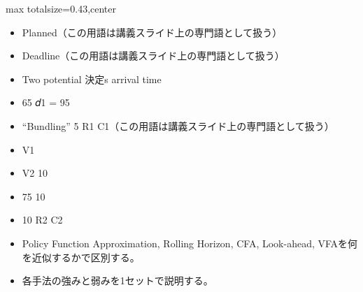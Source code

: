 \clearpage
{}
\begin{minipage}[t]{0.405\textwidth}
\begin{adjustbox}{max totalsize={\textwidth}{0.43\textheight},center}
\begin{minipage}{\textwidth}\scriptsize
{}\begin{itemize}
\item Planned（この用語は講義スライド上の専門語として扱う）
\item Deadline（この用語は講義スライド上の専門語として扱う）
\item Two potential 決定s arrival time
\item 65 𝑑1 = 95
\item “Bundling” 5 R1 C1（この用語は講義スライド上の専門語として扱う）
\item V1
\item V2 10
\item 75 10
\item 10 R2 C2
\end{itemize}\begin{itemize}
\item Policy Function Approximation, Rolling Horizon, CFA, Look-ahead, VFAを何を近似するかで区別する。
\item 各手法の強みと弱みを1セットで説明する。
\end{itemize}
\end{minipage}
\end{adjustbox}
\end{minipage}\hfill

